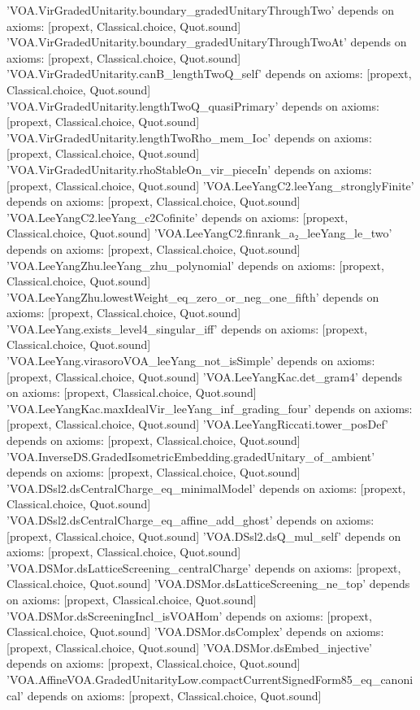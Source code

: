 \begin{plaincode}
'VOA.VirGradedUnitarity.boundary_gradedUnitaryThroughTwo' depends on axioms: [propext, Classical.choice, Quot.sound]
'VOA.VirGradedUnitarity.boundary_gradedUnitaryThroughTwoAt' depends on axioms: [propext, Classical.choice, Quot.sound]
'VOA.VirGradedUnitarity.canB_lengthTwoQ_self' depends on axioms: [propext, Classical.choice, Quot.sound]
'VOA.VirGradedUnitarity.lengthTwoQ_quasiPrimary' depends on axioms: [propext, Classical.choice, Quot.sound]
'VOA.VirGradedUnitarity.lengthTwoRho_mem_Ioc' depends on axioms: [propext, Classical.choice, Quot.sound]
'VOA.VirGradedUnitarity.rhoStableOn_vir_pieceIn' depends on axioms: [propext, Classical.choice, Quot.sound]
'VOA.LeeYangC2.leeYang_stronglyFinite' depends on axioms: [propext, Classical.choice, Quot.sound]
'VOA.LeeYangC2.leeYang_c2Cofinite' depends on axioms: [propext, Classical.choice, Quot.sound]
'VOA.LeeYangC2.finrank_a₂_leeYang_le_two' depends on axioms: [propext, Classical.choice, Quot.sound]
'VOA.LeeYangZhu.leeYang_zhu_polynomial' depends on axioms: [propext, Classical.choice, Quot.sound]
'VOA.LeeYangZhu.lowestWeight_eq_zero_or_neg_one_fifth' depends on axioms: [propext, Classical.choice, Quot.sound]
'VOA.LeeYang.exists_level4_singular_iff' depends on axioms: [propext, Classical.choice, Quot.sound]
'VOA.LeeYang.virasoroVOA_leeYang_not_isSimple' depends on axioms: [propext, Classical.choice, Quot.sound]
'VOA.LeeYangKac.det_gram4' depends on axioms: [propext, Classical.choice, Quot.sound]
'VOA.LeeYangKac.maxIdealVir_leeYang_inf_grading_four' depends on axioms: [propext, Classical.choice, Quot.sound]
'VOA.LeeYangRiccati.tower_posDef' depends on axioms: [propext, Classical.choice, Quot.sound]
'VOA.InverseDS.GradedIsometricEmbedding.gradedUnitary_of_ambient' depends on axioms: [propext, Classical.choice, Quot.sound]
'VOA.DSsl2.dsCentralCharge_eq_minimalModel' depends on axioms: [propext, Classical.choice, Quot.sound]
'VOA.DSsl2.dsCentralCharge_eq_affine_add_ghost' depends on axioms: [propext, Classical.choice, Quot.sound]
'VOA.DSsl2.dsQ_mul_self' depends on axioms: [propext, Classical.choice, Quot.sound]
'VOA.DSMor.dsLatticeScreening_centralCharge' depends on axioms: [propext, Classical.choice, Quot.sound]
'VOA.DSMor.dsLatticeScreening_ne_top' depends on axioms: [propext, Classical.choice, Quot.sound]
'VOA.DSMor.dsScreeningIncl_isVOAHom' depends on axioms: [propext, Classical.choice, Quot.sound]
'VOA.DSMor.dsComplex' depends on axioms: [propext, Classical.choice, Quot.sound]
'VOA.DSMor.dsEmbed_injective' depends on axioms: [propext, Classical.choice, Quot.sound]
'VOA.AffineVOA.GradedUnitarityLow.compactCurrentSignedForm85_eq_canonical' depends on axioms: [propext, Classical.choice, Quot.sound]

\end{plaincode}
